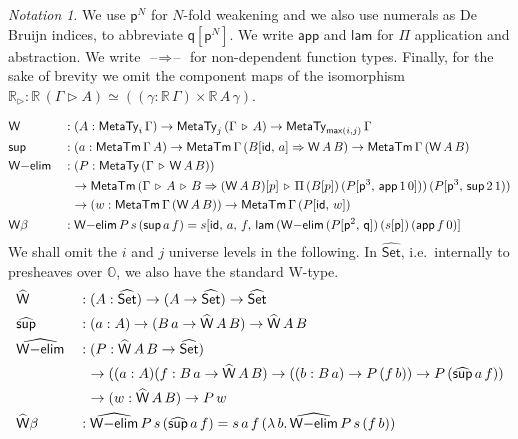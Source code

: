 \documentclass[acmsmall,screen,review,anonymous]{acmart}
\newcommand{\mit}[1]{{\mathsf{#1}}}
\newcommand{\msf}[1]{{\mathsf{#1}}}
\newcommand{\mbb}[1]{\mathbb{#1}}
\newcommand{\p}{\mathsf{p}}
\newcommand{\q}{\mathsf{q}}
\newcommand{\wh}[1]{\widehat{#1}}
\newcommand{\whset}{\wh{\Set}}
\newcommand{\re}{\mbb{R}}
\newcommand{\mbbo}{\mbb{O}}
\newcommand{\vW}{\mathsf{W}}
\newcommand{\vsup}{\mathsf{sup}}
\newcommand{\vid}{\mathsf{id}}
\newcommand{\Set}{\msf{Set}}
\newcommand{\ext}{\triangleright}
\newcommand{\MTy}{\msf{MetaTy}}
\newcommand{\MTm}{\msf{MetaTm}}
\newcommand{\blank}{{\mathord{\hspace{1pt}\text{--}\hspace{1pt}}}}
\theoremstyle{remark}
\newtheorem{notation}{Notation}
\newcommand{\id}{\mit{id}}
\begin{document}
\begin{notation} We use $\p^N$ for $N$-fold
weakening and we also use numerals as De Bruijn indices, to abbreviate
$\q[\p^N]$. We write $\msf{app}$ and $\msf{lam}$ for $\Pi$ application and
abstraction. We write $\blank{\Rightarrow}\blank$ for non-dependent function
types. Finally, for the sake of brevity we omit the component maps of the isomorphism
$\re_\ext : \re\,(\Gamma \ext A) \simeq ((\gamma : \re\,\Gamma) \times \re\,A\,\gamma)$.
\end{notation}
\begin{alignat*}{3}
  &\vW   &&: (A : \MTy_i\,\Gamma) \to \MTy_j\,(\Gamma\,\ext\,A) \to \MTy_{\msf{max}(i,j)}\,\Gamma\\
  &\vsup &&: (a : \MTm\,\Gamma\,A) \to \MTm\,\Gamma\,(B[\vid,\,a] \Rightarrow \vW\,A\,B) \to \MTm\,\Gamma\,(\vW\,A\,B)\\
  &\vW{-}\msf{elim}  &&: (P : \MTy\,(\Gamma\,\ext\,\vW\,A\,B))\\
  &                  && \hspace{0.6em}\to \MTm\,(\Gamma\,\ext\,A\,\ext\,B \Rightarrow (\vW\,A\,B)[p]\,\ext\,\Pi\,(B[p])\,(P[\p^3,\,\msf{app}\,1\,0]))\,(P[\p^3,\,\vsup\,2\,1))\\
  &                  && \hspace{0.6em}\to (w : \MTm\,\Gamma\,(\vW\,A\,B)) \to \MTm\,\Gamma\,(P[\id,\,w])\\
  & \vW{\beta}       &&:
    \vW{-}\msf{elim}\,P\,s\,(\vsup\,a\,f) = s[\id,\,a,\,f,\,\msf{lam}\,(\vW{-}\msf{elim}\,(P[\p^2,\,\q])\,(s[\p])\,(\msf{app}\,f\,0)]
\end{alignat*}
We shall omit the $i$ and $j$ universe levels in the following. In $\whset$,
i.e.\ internally to presheaves over $\mbbo$, we also have the standard W-type.
\begin{alignat*}{3}
  & \wh{\vW}   &&: (A : \whset) \to (A \to \whset) \to \whset\\
  & \wh{\vsup} &&: (a : A) \to (B\,a \to \wh{\vW}\,A\,B) \to \wh{\vW}\,A\,B\\
  & \wh{\vW{-}\msf{elim}} &&: (P : \wh{\vW}\,A\,B \to \whset)\\
  & && \hspace{0.6em}\to ((a : A)(f : B\,a \to \wh{\vW}\,A\,B) \to ((b : B\,a) \to P\,(f\,b)) \to P\,(\wh{\vsup}\,a\,f))\\
  & && \hspace{0.6em}\to (w : \wh{\vW}\,A\,B) \to P\,w\\
  & \wh{\vW}{\beta} &&: \wh{\vW{-}\msf{elim}}\,P\,s\,(\wh{\vsup}\,a\,f) = s\,a\,f\,(\lambda\,b.\,\wh{\vW{-}\msf{elim}}\,P\,s\,(f\,b))
\end{alignat*}
\end{document}
